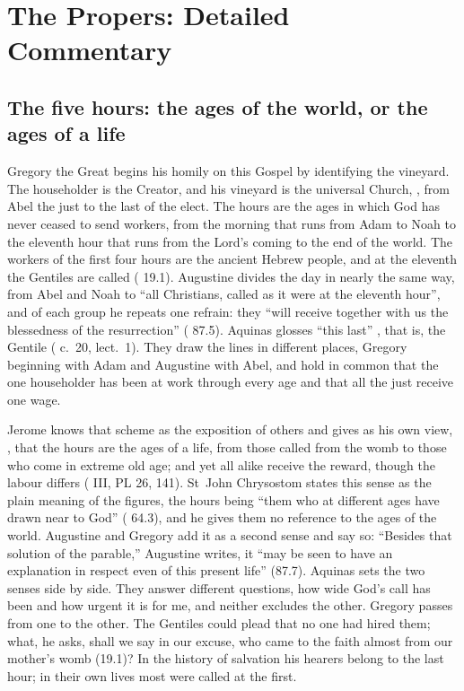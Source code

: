 
\section{The Propers: Detailed Commentary}

\subsection{The five hours: the ages of the world, or the ages of a life}

Gregory the Great begins his homily on this Gospel by identifying the
vineyard. The householder is the Creator, and his vineyard is the universal
Church, , from Abel the just to
the last of the elect. The hours are the ages in which God has never ceased to
send workers, from the morning that runs from Adam to Noah to the eleventh
hour that runs from the Lord's coming to the end of the world. The workers of
the first four hours are the ancient Hebrew people, and at the eleventh the
Gentiles are called ( 19.1). Augustine divides the
day in nearly the same way, from Abel and Noah to ``all Christians, called as
it were at the eleventh hour'', and of each group he repeats one refrain: they
``will receive together with us the blessedness of the resurrection''
( 87.5). Aquinas glosses ``this last'' , that
is, the Gentile ( c.~20, lect.~1). They draw the lines in
different places, Gregory beginning with Adam and Augustine with Abel, and
hold in common that the one householder has been at work through every age
and that all the just receive one wage.

Jerome knows that scheme as the exposition of others and gives as his own
view, , that the hours are the ages of a life, from those called from the
womb to those who come in extreme old age; and yet all alike receive the
reward, though the labour differs
( III, PL 26, 141). St~John Chrysostom states
this
sense as the plain meaning of the figures, the hours being ``them who at
different ages have drawn near to God'' ( 64.3), and
he gives them no reference to the ages of the world. Augustine and Gregory add
it as a second sense and say so: ``Besides that solution of the parable,''
Augustine writes, it ``may be seen to have an explanation in respect even of
this present life'' (87.7). Aquinas sets the two senses side by side. They
answer different questions, how wide God's call has been and how urgent it is
for me, and neither excludes the other. Gregory passes from one to the other.
The Gentiles could plead that no one had hired them; what, he
asks, shall we say in our excuse, who came to the faith almost from our
mother's womb (19.1)? In the history of salvation his hearers belong to the
last hour; in their own lives most were called at the first.

